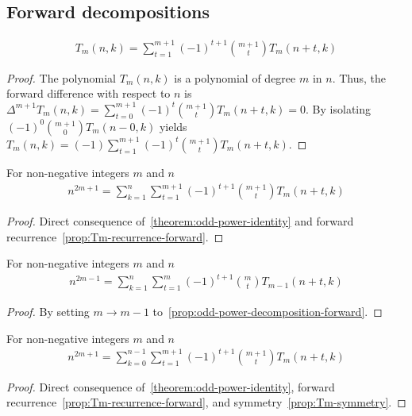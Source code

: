 \subsection{Forward decompositions}\label{subsec:forward-decompositions}
\begin{proposition}
    \label{prop:Tm-recurrence-forward}
    \begin{align*}
        T_{m} (n,k) = \sum_{t=1}^{m+1} (-1)^{t+1} \binom{m+1}{t} T_{m} (n+t, k)
    \end{align*}
    \begin{proof}
        The polynomial $T_{m} (n,k)$ is a polynomial of degree $m$ in $n$.
        Thus, the forward difference with respect to $n$ is
        $\Delta^{m+1} T_{m} (n, k) = \sum_{t=0}^{m+1} (-1)^{t} \binom{m+1}{t} T_{m} (n+t, k) = 0$.
        By isolating $(-1)^{0} \binom{m+1}{0} T_{m} (n-0, k)$ yields
        $T_{m} (n, k) = (-1) \sum_{t=1}^{m+1} (-1)^{t} \binom{m+1}{t} T_{m} (n+t, k)$.
    \end{proof}
\end{proposition}

\begin{proposition}
    \label{prop:odd-power-decomposition-forward}
    For non-negative integers $m$ and $n$
    \begin{align*}
        n^{2m+1} = \sum_{k=1}^{n} \sum_{t=1}^{m+1} (-1)^{t+1} \binom{m+1}{t} T_{m} (n+t, k)
    \end{align*}
    \begin{proof}
        Direct consequence of~\eqref{theorem:odd-power-identity}
        and forward recurrence~\eqref{prop:Tm-recurrence-forward}.
    \end{proof}
\end{proposition}

\begin{proposition}
    \label{prop:odd-power-decomposition-forward-m-1}
    For non-negative integers $m$ and $n$
    \begin{align*}
        n^{2m-1} = \sum_{k=1}^{n} \sum_{t=1}^{m} (-1)^{t+1} \binom{m}{t} T_{m-1} (n+t, k)
    \end{align*}
    \begin{proof}
        By setting $m \rightarrow m-1$ to~\eqref{prop:odd-power-decomposition-forward}.
    \end{proof}
\end{proposition}

\begin{proposition}
    \label{prop:odd-power-decomposition-forward-shifted}
    For non-negative integers $m$ and $n$
    \begin{align*}
        n^{2m+1} = \sum_{k=0}^{n-1} \sum_{t=1}^{m+1} (-1)^{t+1} \binom{m+1}{t} T_{m} (n+t, k)
    \end{align*}
    \begin{proof}
        Direct consequence of~\eqref{theorem:odd-power-identity},
        forward recurrence~\eqref{prop:Tm-recurrence-forward}, and symmetry~\eqref{prop:Tm-symmetry}.
    \end{proof}
\end{proposition}

